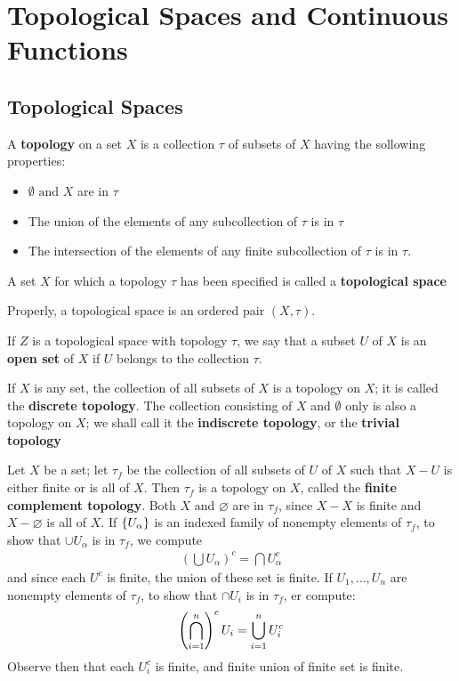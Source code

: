 \chapter{Topological Spaces and Continuous Functions}
\section{Topological Spaces}
\begin{define}
	A \textbf{topology} on a set $X$ is a collection $\tau$ of subsets of $X$ having the sollowing properties:
	\begin{itemize}
		\item $\emptyset \textrm{ and } X $ are in $\tau$ 
		\item The union of the elements of any subcollection of $ \tau $ is in $ \tau $
		\item The intersection of the elements of any finite subcollection of $ \tau $ is in $ \tau $.
	\end{itemize}
	A set $ X $ for which a topology $ \tau $ has been specified is called a \textbf{topological space}
\end{define}
Properly, a topological space is an ordered pair $ (X, \tau) $.

If $Z$ is a topological space with topology $ \tau $, we say that a subset $U$ of $X$ is an \textbf{open set} of $X$ if $U$ belongs to the collection $ \tau $. 

\begin{exm}
	If $X$ is any set, the collection of all subsets of $X$ is a topology on $X$; it is called the \textbf{discrete topology}. The collection consisting of $X$ and $\emptyset$ only is also a topology on $X$; we shall call it the \textbf{indiscrete topology}, or the \textbf{trivial topology}
\end{exm}
\begin{exm}
	Let $X$ be a set; let $\tau_f $ be the collection of all subsets of $U$ of $X$ such that $ X-U$ is either finite or is all of $X$. Then $\tau_f$ is a topology on $X$, called the \textbf{finite complement topology}. Both $X$ and $\varnothing$ are in $ \tau_f$, since $ X-X $ is finite and $ X - \varnothing $ is all of $X$. If $ \left\lbrace U_\alpha \right\rbrace $ is an indexed family of nonempty elements of $ \tau_f $, to show that $ \cup U_\alpha $ is in $\tau_f$, we compute
	\begin{align*}
	(\bigcup U_\alpha)^c = \bigcap U_{\alpha}^c
	\end{align*}
	and since each $U^c$ is finite, the union of these set is finite. If $ U_1, \ldots, U_n$ are nonempty elements of $ \tau_f$, to show that $ \cap U_i $ is in $ \tau_f$, er compute:
	\begin{align*}
		\left( \bigcap_{i=1}^n \right)^c U_i = \bigcup_{i=1}^n U_i^c
	\end{align*}
	Observe then that each $U_i^c $ is finite, and finite union of finite set is finite.
\end{exm}